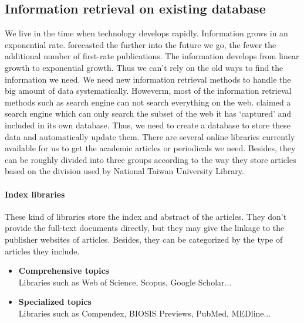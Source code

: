 	
\subsection{Information retrieval on existing database}
	We live in the time when technology develops rapidly. Information grows in an exponential rate. \cite{Tague1981} forecasted the further into the future we go, the fewer the additional number of first-rate publications. The information develops from linear growth to exponential growth. Thus we can't rely on the old ways to find the information we need. We need new information retrieval methods to handle the big amount of data systematically. Howeverm, most of the information retrieval methods such as search engine can not search everything on the web. 
	\cite{Grehan2002} claimed a search engine which can only search the subset of the web it has ‘captured’ and included in its own database. Thus, we need to create a database to store these data and automatically update them.
	There are several online libraries currently available for us to get the academic articles or periodicals we need.
	Besides, they can be roughly divided into three groups according to the way they store articles based on the division used by National Taiwan University Library.

\paragraph{Index libraries}
	These kind of libraries store the index and abstract of the articles.
	They don't provide the full-text documents directly, but they may give the linkage to the publisher websites of articles.
	Besides, they can be categorized by the type of articles they include.
	
	\begin{itemize}		
		\item\textbf{Comprehensive topics}\\Libraries such as Web of Science, Scopus, Google Scholar...
		\item\textbf{Specialized topics}\\Libraries such as Compendex, BIOSIS Previews, PubMed, MEDline...		
	\end{itemize}
	
